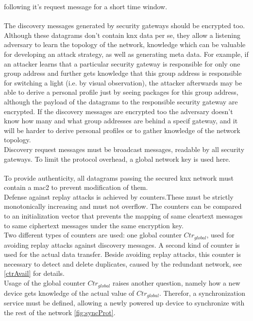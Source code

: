 following it's request message for a short time window.
\\
\\
The discovery messages generated by security gateways should be encrypted too. Although these datagrams don't contain \gls{knx} data per se, they allow
a listening adversary to learn the topology of the network, knowledge which can be valuable for developing an attack strategy, as well as generating meta data.
For example, if an attacker learns that a particular security gateway is responsible for only one group address and further gets knowledge that this 
group address is responsible for switching a light (i.e. by visual observation), the attacker afterwards may be able to derive a personal profile just by seeing
packages for this group address, although the payload of the datagrams to the responsible security gateway are encrypted.
If the discovery messages are encrypted too the adversary doesn't know how many and what
group addresses are behind a specif gateway, and it will be harder to derive personal profiles or to gather knowledge of the network topology.
\\
Discovery request messages must be broadcast messages, readable by all security gateways. To limit the protocol overhead, a global network key is used here.
\\
\\
To provide authenticity, all datagrams passing the secured \gls{knx} network must contain a \gls{mac2} to prevent modification of them.
\\
Defense against replay attacks is achieved by counters.These must be strictly monotonically
increasing and must not overflow. The counters can be compared to an initialization vector that prevents the mapping of same cleartext messages to same ciphertext messages
under the same encryption key.
\\
Two different types of counters are used: one global counter $Ctr_{global}$, used for avoiding replay attacks against discovery messages. A second kind of counter
is used for the actual data transfer. Beside avoiding replay attacks, this counter is necessary to detect and delete duplicates, caused by the redundant network, 
see \ref{ctrAvail} for details.
\\
Usage of the global counter $Ctr_{global}$ raises another question, namely how a new device gets knowledge of the actual value of $Ctr_{global}$.
Therefor, a synchronization service must be defined, allowing a newly powered up device to synchronize with the rest of the network \ref{fig:syncProt}.
